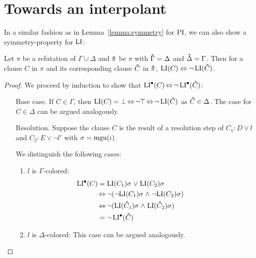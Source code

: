 \section{Towards an interpolant}

In a similar fashion as in Lemma~\ref{lemma:symmetry} for $\operatorname{PI}$, we can also show a symmetry-property for $\operatorname{LI}$:

\begin{lemma}
	\label{lemma:li_symmetry}
	Let $\pi$ be a refutation of $\Gamma\cup\Delta$ and $\bm\hat \pi$ be $\pi$ with $\bm\hat \Gamma = \Delta$ and $\bm\hat \Delta = \Gamma$.
	Then for a clause $C$ in $\pi$ and its corresponding clause $\bm\hat C$ in $\bm\hat \pi$, $\operatorname{LI}(C) \;{\operatorname{\Leftrightarrow}}\; \lnot \operatorname{LI}(\bm\hat C)$.
\end{lemma}
\begin{proof}
	We proceed by induction to show that $\operatorname{LI}^\bullet(C) \operatorname{\Leftrightarrow} \lnot \operatorname{LI}^\bullet(\bm\hat C)$:
	\begin{itemize}
		\item[Base case.]
			If $C \in \Gamma$, then $\operatorname{LI}(C) = \bot \operatorname{\Leftrightarrow} \lnot \top \operatorname{\Leftrightarrow} \lnot \operatorname{LI}(\bm\hat C)$ as $\bm\hat C\in\Delta$. 
			The case for $C\in\Delta$ can be argued analogously.

		\item[Resolution.]
			Suppose the clause $C$ is the result of a resolution step \inference{} of $C_1: D \lor l$ and $C_2: E \lor \lnot l'$ with $\sigma = \operatorname{mgu}(\iota)$.

			We distinguish the following cases:

			\begin{enumerate}

				\item $l$ is $\Gamma$-colored:
					\begin{align*}
						\hspace*{\dimexpr-\leftmargini-\leftmarginii}
						\LIpre(C)	&= \LI(C_1)\sigma\spas\lor {\LI(C_2)\sigma} \\
															 &\semiff \lnot (\lnot{\LI(C_1)\sigma}\spas\land \lnot {\LI(C_2)\sigma}) \\
															 &\semiff \lnot ({\LI(\bhat C_1)\sigma}\spas\land {\LI(\bhat C_2)\sigma}) \\
															 &= \lnot \LIpre(\bhat C)
					\end{align*}

				\item $l$ is $\Delta$-colored:
					This case can be argued analogously.


\end{enumerate}
\end{itemize}
\end{proof}
